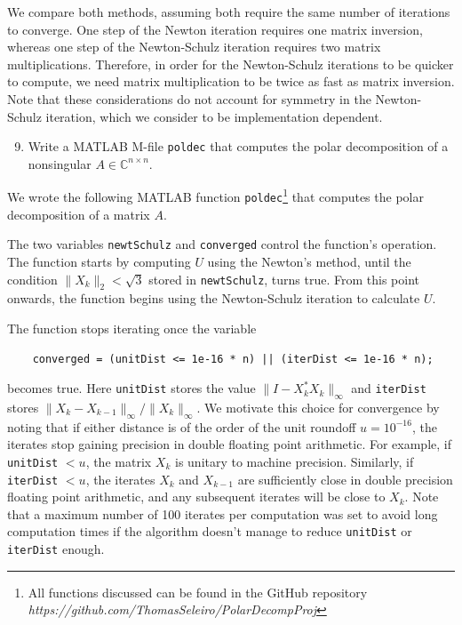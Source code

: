 \documentclass[10pt, A4paper]{article}
\newcommand{\nxn}{n \times n}
\begin{document}
We compare both methods, assuming both require the same number of 
iterations to converge. 
One step of the Newton iteration requires one matrix inversion, whereas 
one step of the Newton-Schulz iteration requires two matrix 
multiplications.
Therefore, in order for the Newton-Schulz iterations to be quicker to 
compute, we need matrix multiplication to be twice as fast as matrix 
inversion.
Note that these considerations do not account for symmetry in the 
Newton-Schulz iteration, which we consider to be implementation 
dependent. 





\vspace{0.2cm}
\begin{enumerate}
	\setcounter{enumi}{8}
	\item Write a MATLAB M-file \texttt{poldec} that computes the 
	polar decomposition of a nonsingular $A \in \mathbb{C}^{\nxn}$.
\end{enumerate}

We wrote the following MATLAB function \texttt{poldec}\footnote{
All functions discussed can be found in the GitHub repository
\emph{https://github.com/ThomasSeleiro/PolarDecompProj}}
that computes the polar decomposition of a matrix $A$.

{\small
{}
}

The two variables \texttt{newtSchulz} and \texttt{converged} control 
the function's operation.
The function starts by computing $U$ using the Newton's method, until
the condition $\|X_k\|_2 < \sqrt{3}$ stored in \texttt{newtSchulz},
turns true. 
From this point onwards, the function begins using the {Newton-Schulz} 
iteration to calculate $U$.

The function stops iterating once the variable
\begin{verbatim}
	converged = (unitDist <= 1e-16 * n) || (iterDist <= 1e-16 * n);
\end{verbatim}
becomes true.
Here \texttt{unitDist} stores the value $\|I -X_k^*X_k\|_\infty$ and 
\texttt{iterDist} stores $\|X_k - X_{k-1} \|_\infty / \|X_k\|_\infty$.
We motivate this choice for convergence by noting that if either 
distance is of the order of the unit roundoff $u = 10^{-16}$, the 
iterates stop gaining precision in double floating point arithmetic.
For example, if \texttt{unitDist} $< u$, the matrix $X_k$ is unitary to 
machine precision. Similarly, if \texttt{iterDist} $< u$, the iterates 
$X_k$ and $X_{k-1}$ are sufficiently close in double precision floating 
point arithmetic, and any subsequent iterates will be close to $X_k$.
Note that a maximum number of 100 iterates per computation was set to 
avoid long computation times if the algorithm doesn't manage to reduce 
\texttt{unitDist} or \texttt{iterDist} enough.
\end{document}
